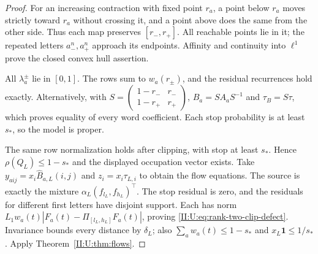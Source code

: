 \begin{proof}
For an increasing contraction with fixed point $r_a$, a point below
$r_a$ moves strictly toward $r_a$ without crossing it, and a point
above does the same from the other side. Thus each map preserves
$[r_-,r_+]$. All reachable points lie in it; the repeated letters
$a_-^n,a_+^n$ approach its endpoints. Affinity and continuity into
$\ell^1$ prove the closed convex hull assertion.

All $\lambda_a^\pm$ lie in $[0,1]$. The rows sum to $w_a(r_\pm)$,
and the residual recurrences hold exactly. Alternatively, with
$S=\left(\begin{smallmatrix}1-r_-&r_-\\1-r_+&r_+\end{smallmatrix}\right)$,
$B_a=SA_aS^{-1}$ and $\tau_B=S\tau$, which proves equality of
every word coefficient. Each stop probability is at least $s_*$,
so the model is proper.

The same row normalization holds after clipping, with stop at least
$s_*$. Hence $\rho(Q_L)\le1-s_*$ and the displayed occupation vector
exists. Take $y_{aij}=x_i\widehat B_{a,L}(i,j)$ and
$z_i=x_i\tau_{L,i}$ to obtain the flow equations. The source is
exactly the mixture $\alpha_L(f_{l_L},f_{h_L})^\top$.
The stop residual is zero, and the residuals for different first
letters have disjoint support. Each has norm
$L_1w_a(t)|F_a(t)-\Pi_{[l_L,h_L]}F_a(t)|$, proving
\eqref{II:U:eq:rank-two-clip-defect}.
Invariance bounds every distance by $\delta_L$; also
$\sum_a w_a(t)\le1-s_*$ and $x_L\mathbf1\le1/s_*$.
Apply Theorem~\ref{II:U:thm:flows}.
\end{proof}
